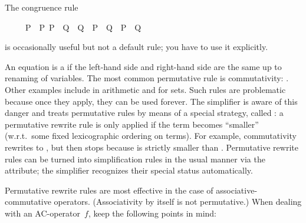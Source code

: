 \begin{isabellebody}
\begin{isamarkuptext}
\begin{warn}
The congruence rule 
\begin{isabelle}%
\ \ \ \ \ {\isasymlbrakk}P\ {\isacharequal}\ P{\isacharprime}{\isacharsemicolon}\ P{\isacharprime}\ {\isasymLongrightarrow}\ Q\ {\isacharequal}\ Q{\isacharprime}{\isasymrbrakk}\ {\isasymLongrightarrow}\ {\isacharparenleft}P\ {\isasymand}\ Q{\isacharparenright}\ {\isacharequal}\ {\isacharparenleft}P{\isacharprime}\ {\isasymand}\ Q{\isacharprime}{\isacharparenright}%
\end{isabelle}
is occasionally useful but not a default rule; you have to use it explicitly.
\end{warn}%
\end{isamarkuptext}%
%
%
\begin{isamarkuptext}%
An equation is a  if the left-hand
side and right-hand side are the same up to renaming of variables.  The most
common permutative rule is commutativity: .  Other examples
include  in arithmetic and  for sets. Such rules are problematic because
once they apply, they can be used forever. The simplifier is aware of this
danger and treats permutative rules by means of a special strategy, called
: a permutative rewrite
rule is only applied if the term becomes ``smaller'' (w.r.t.\ some fixed
lexicographic ordering on terms). For example, commutativity rewrites
 to , but then stops because  is strictly
smaller than .  Permutative rewrite rules can be turned into
simplification rules in the usual manner via the  attribute; the
simplifier recognizes their special status automatically.

Permutative rewrite rules are most effective in the case of
associative-commutative operators.  (Associativity by itself is not
permutative.)  When dealing with an AC-operator~$f$, keep the
following points in mind:
\begin{itemize}
  

\end{itemize}
\end{isamarkuptext}
\end{isabellebody}
